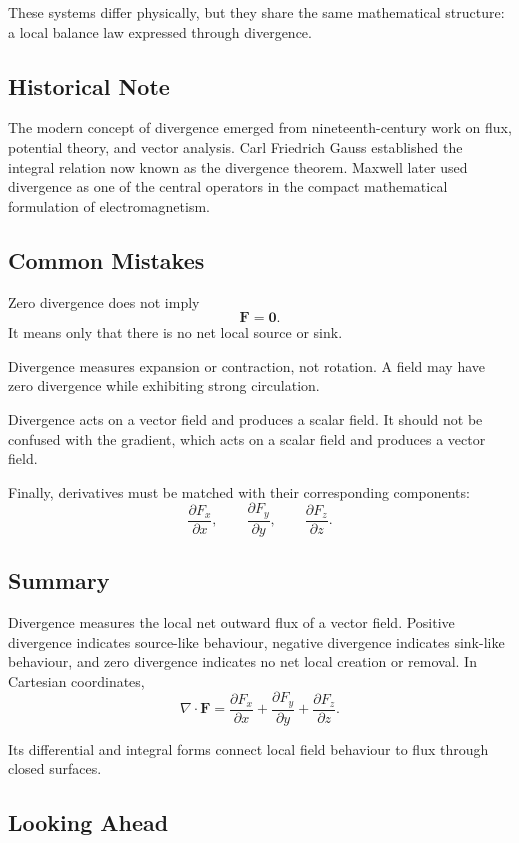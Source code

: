 These systems differ physically, but they share the same mathematical
structure: a local balance law expressed through divergence.

\subsection{Historical Note}

The modern concept of divergence emerged from nineteenth-century work on flux,
potential theory, and vector analysis. Carl Friedrich Gauss established the
integral relation now known as the divergence theorem. Maxwell later used
divergence as one of the central operators in the compact mathematical
formulation of electromagnetism.

\subsection{Common Mistakes}

Zero divergence does not imply
\[
\mathbf F=\mathbf 0.
\]
It means only that there is no net local source or sink.

Divergence measures expansion or contraction, not rotation. A field may have
zero divergence while exhibiting strong circulation.

Divergence acts on a vector field and produces a scalar field. It should not be
confused with the gradient, which acts on a scalar field and produces a vector
field.

Finally, derivatives must be matched with their corresponding components:
\[
\frac{\partial F_x}{\partial x},
\qquad
\frac{\partial F_y}{\partial y},
\qquad
\frac{\partial F_z}{\partial z}.
\]

\subsection{Summary}

Divergence measures the local net outward flux of a vector field. Positive
divergence indicates source-like behaviour, negative divergence indicates
sink-like behaviour, and zero divergence indicates no net local creation or
removal. In Cartesian coordinates,
\[
\nabla\cdot\mathbf F
=
\frac{\partial F_x}{\partial x}
+
\frac{\partial F_y}{\partial y}
+
\frac{\partial F_z}{\partial z}.
\]

Its differential and integral forms connect local field behaviour to flux
through closed surfaces.

\subsection*{Looking Ahead}


